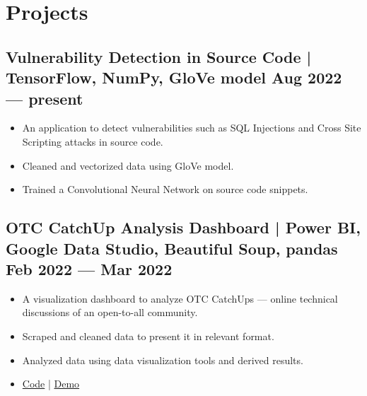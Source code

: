 \documentclass[10pt]{article}
\newenvironment{zitemize}{
\begin{itemize}\itemsep2pt \parskip0pt \parsep1pt}
{\end{itemize}\vspace{-0.7cm}}
\begin{document}
\section{Projects} %



\subsection*{Vulnerability Detection in Source Code | \normalfont{} \normalsize TensorFlow, NumPy, GloVe model \hfill Aug 2022 --- present}
    \begin{zitemize}
    \item An application to detect vulnerabilities such as SQL Injections and Cross Site Scripting attacks in source code.
     \item Cleaned and vectorized data using GloVe model.
        \item Trained a Convolutional Neural Network on source code snippets.
       
    \end{zitemize}
\subsection*{OTC CatchUp Analysis Dashboard | \normalfont{} \normalsize Power BI, Google Data Studio, Beautiful Soup, pandas \hfill 
Feb 2022 --- Mar 2022}
    \begin{zitemize}
    \item A visualization dashboard to analyze OTC CatchUps --- online technical discussions of an open-to-all community.
     \item Scraped and cleaned data to present it in relevant format.
        \item Analyzed data using data visualization tools and derived results.
       \item \href{https://github.com/mihikagaonkar/OTC-Dashboard/}{Code}
| \href{https://mihikagaonkar.github.io/OTC-Dashboard/data_studio}{Demo}
    \end{zitemize}
\end{document}
